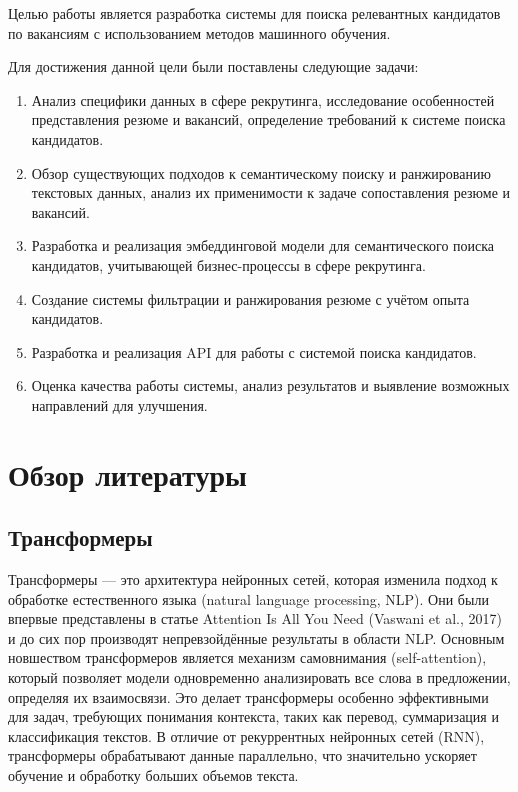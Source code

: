 \documentclass[14pt]{mmcs_article}
\begin{document}
Целью работы является разработка системы для поиска релевантных кандидатов по вакансиям с использованием методов машинного обучения.

Для достижения данной цели были поставлены следующие задачи:
\begin{enumerate}
  \item Анализ специфики данных в сфере рекрутинга, исследование особенностей представления резюме и вакансий, определение требований к системе поиска кандидатов.
  \item Обзор существующих подходов к семантическому поиску и ранжированию текстовых данных, анализ их применимости к задаче сопоставления резюме и вакансий.
  \item Разработка и реализация эмбеддинговой модели для семантического поиска кандидатов, учитывающей бизнес-процессы в сфере рекрутинга.
  \item Создание системы фильтрации и ранжирования резюме с учётом опыта кандидатов.
  \item Разработка и реализация API для работы с системой поиска кандидатов.
  \item Оценка качества работы системы, анализ результатов и выявление возможных направлений для улучшения.
\end{enumerate}


\newpage
\section*{Обзор литературы}\label{literature_review}

\subsection*{Трансформеры}\label{transformers}

Трансформеры — это архитектура нейронных сетей, которая изменила подход к обработке естественного языка (natural language processing, NLP). Они были впервые представлены в статье Attention Is All You Need (Vaswani et al., 2017) \cite{vaswani2023attentionneed} и до сих пор производят непревзойдённые результаты в области NLP. Основным новшеством трансформеров является механизм самовнимания (self-attention), который позволяет модели одновременно анализировать все слова в предложении, определяя их взаимосвязи. Это делает трансформеры особенно эффективными для задач, требующих понимания контекста, таких как перевод, суммаризация и классификация текстов. В отличие от рекуррентных нейронных сетей (RNN), трансформеры обрабатывают данные параллельно, что значительно ускоряет обучение и обработку больших объемов текста.
\end{document}
